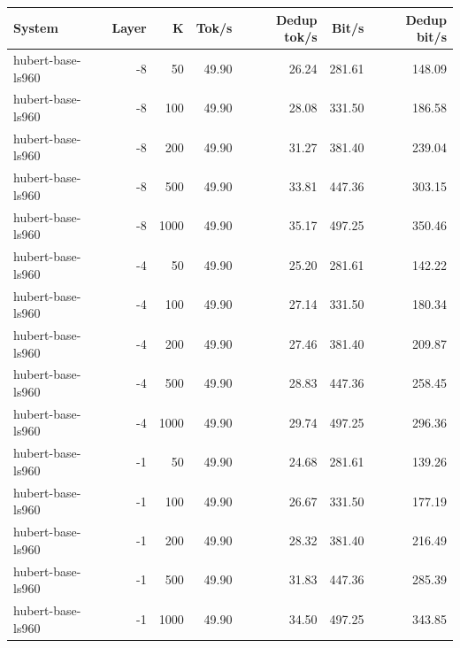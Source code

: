 \begin{tabular}{lrrrrrr}
\toprule
System & Layer & K & Tok/s & Dedup tok/s & Bit/s & Dedup bit/s \\
\midrule
hubert-base-ls960 & -8 & 50 & 49.90 & 26.24 & 281.61 & 148.09 \\
hubert-base-ls960 & -8 & 100 & 49.90 & 28.08 & 331.50 & 186.58 \\
hubert-base-ls960 & -8 & 200 & 49.90 & 31.27 & 381.40 & 239.04 \\
hubert-base-ls960 & -8 & 500 & 49.90 & 33.81 & 447.36 & 303.15 \\
hubert-base-ls960 & -8 & 1000 & 49.90 & 35.17 & 497.25 & 350.46 \\
hubert-base-ls960 & -4 & 50 & 49.90 & 25.20 & 281.61 & 142.22 \\
hubert-base-ls960 & -4 & 100 & 49.90 & 27.14 & 331.50 & 180.34 \\
hubert-base-ls960 & -4 & 200 & 49.90 & 27.46 & 381.40 & 209.87 \\
hubert-base-ls960 & -4 & 500 & 49.90 & 28.83 & 447.36 & 258.45 \\
hubert-base-ls960 & -4 & 1000 & 49.90 & 29.74 & 497.25 & 296.36 \\
hubert-base-ls960 & -1 & 50 & 49.90 & 24.68 & 281.61 & 139.26 \\
hubert-base-ls960 & -1 & 100 & 49.90 & 26.67 & 331.50 & 177.19 \\
hubert-base-ls960 & -1 & 200 & 49.90 & 28.32 & 381.40 & 216.49 \\
hubert-base-ls960 & -1 & 500 & 49.90 & 31.83 & 447.36 & 285.39 \\
hubert-base-ls960 & -1 & 1000 & 49.90 & 34.50 & 497.25 & 343.85 \\
\bottomrule
\end{tabular}
